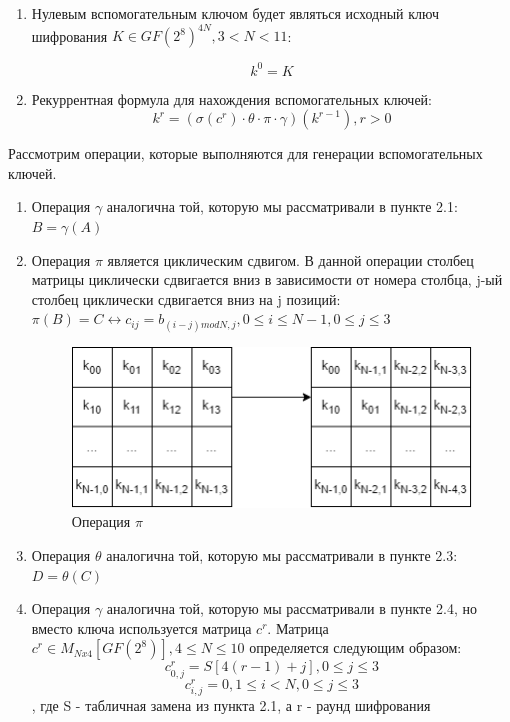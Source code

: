 \documentclass[12pt]{article}
\begin{document}
\begin{enumerate}
    \item Нулевым вспомогательным ключом будет являться исходный ключ шифрования $K \in GF(2^{8})^{4N}, 
    
    3 < N < 11$:

  
    \[k^{0} = K \]
    \item Рекуррентная формула для нахождения вспомогательных ключей: 
    \[k^{r} = (\sigma(c^{r}) \cdot \theta \cdot \pi \cdot \gamma)(k^{r-1}), r > 0 \]
\end{enumerate}
\newline
Рассмотрим операции, которые выполняются для генерации вспомогательных ключей.
\begin{enumerate}
    \item Операция $\gamma$ аналогична той, которую мы рассматривали в пункте 2.1: $B = \gamma(A)$
    \item Операция $\pi$ является циклическим сдвигом. В данной операции столбец матрицы циклически сдвигается вниз в зависимости от номера столбца, j-ый столбец циклически сдвигается вниз на j позиций: $\pi(B) = C \leftrightarrow c_{ij} = b_{(i-j)modN, j}, 0 \leq i \leq N - 1, 0 \leq j \leq 3$
    
    \begin{figure}[h]
        \centering
        \includegraphics[width=0.4\linewidth]{operation_pi.png}
        \caption{Операция $\pi$}
        \label{fig:scheme}
    \end{figure}
    
    \item Операция $\theta$ аналогична той, которую мы рассматривали в пункте 2.3: $D = \theta(C)$
    \item Операция $\gamma$ аналогична той, которую мы рассматривали в пункте 2.4, но вместо ключа используется матрица $c^{r}$. Матрица $c^{r} \in M_{Nx4}[GF(2^{8})], 4 \leq N \leq 10$ определяется следующим образом:
\[c^{r}_{0,j} = S[4(r-1) + j], 0 \leq j \leq 3\]
\[c^{r}_{i,j} = 0, 1 \leq i < N, 0 \leq j \leq 3\]
, где S - табличная замена из пункта 2.1, а r - раунд шифрования

\end{enumerate}
\end{document}
